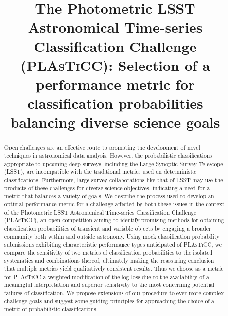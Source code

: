 \documentclass[\docopts]{\docclass}
\begin{document}
\linenumbers

\title{The Photometric \textsc{LSST} Astronomical Time-series Classification Challenge (\textsc{PLAsTiCC}): Selection of a performance metric for classification probabilities balancing diverse science goals}

\maketitlepre

\begin{abstract}

  Open challenges are an effective route to promoting the development of novel techniques in astronomical data analysis.
  However, the probabilistic classifications appropriate to upcoming deep surveys, including the Large Synoptic Survey Telescope (\textsc{LSST}), are incompatible with the traditional metrics used on deterministic classifications.
  Furthermore, large survey collaborations like that of \textsc{LSST} may use the products of these challenges for diverse science objectives, indicating a need for a metric that balances a variety of goals.
  We describe the process used to develop an optimal performance metric for a challenge affected by both these issues in the context of the Photometric \textsc{LSST} Astronomical Time-series Classification Challenge (\textsc{PLAsTiCC}), an open competition aiming to identify promising methods for obtaining classification probabilities of transient and variable objects by engaging a broader community both within and outside astronomy.
  Using mock classification probability submissions exhibiting characteristic performance types anticipated of \textsc{PLAsTiCC}, we compare the sensitivity of two metrics of classification probabilities to the isolated systematics and combinations thereof, ultimately making the reassuring conclusion that multiple metrics yield qualitatively consistent results.
  Thus we choose as a metric for \textsc{PLAsTiCC} a weighted modification of the log-loss due to the availability of a meaningful interpretation and superior sensitivity to the most concerning potential failures of classification.
  We propose extensions of our procedure to ever more complex challenge goals and suggest some guiding principles for approaching the choice of a metric of probabilistic classifications.

\end{abstract}

\dockeys{}

\maketitlepost

\end{document}
